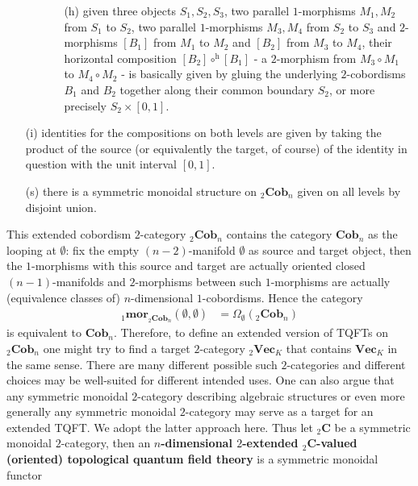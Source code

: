 \begin{enumerate}
\begin{enumerate}
\begin{enumerate}
\item[(h)]
given three objects $S_{1},S_{2},S_{3}$, two parallel $1$-morphisms $M_{1},M_{2}$ from $S_{1}$ to $S_{2}$, two parallel $1$-morphisms $M_{3},M_{4}$ from $S_{2}$ to $S_{3}$ and $2$-morphisms $[B_{1}]$ from $M_{1}$ to $M_{2}$ and $[B_{2}]$ from $M_{3}$ to $M_{4}$, their horizontal composition $[B_{2}] \circ^{\mathrm{h}} [B_{1}]$ - a $2$-morphism from $M_{3} \circ M_{1}$ to $M_{4} \circ M_{2}$ - is basically given by gluing the underlying $2$-cobordisms $B_{1}$ and $B_{2}$ together along their common boundary $S_{2}$, or more precisely $S_{2} \times [0,1]$.
\end{enumerate}
\end{enumerate}

\item[(i)]
identities for the compositions on both levels are given by taking the product of the source (or equivalently the target, of course) of the identity in question with the unit interval $[0,1]$.

\item[(s)]
there is a symmetric monoidal structure on ${_{2}}\mathbf{Cob}_{n}$ given on all levels by disjoint union.
\end{enumerate}
This extended cobordism $2$-category ${_{2}}\mathbf{Cob}_{n}$ contains the category $\mathbf{Cob}_{n}$ as the looping at $\emptyset$: fix the empty $(n-2)$-manifold $\emptyset$ as source and target object, then the $1$-morphisms with this source and target are actually oriented closed $(n-1)$-manifolds and $2$-morphisms between such $1$-morphisms are actually (equivalence classes of) $n$-dimensional $1$-cobordisms. Hence the category
\begin{align*}
  _{1}\mathbf{mor}_{{_{2}}\mathbf{Cob}_{n}}
  \left(
    \emptyset
    ,
    \emptyset
  \right)
  &=
  \Omega_{\emptyset}
  \left(
    {_{2}}\mathbf{Cob}_{n}
  \right)
\end{align*}
is equivalent to $\mathbf{Cob}_{n}$. Therefore, to define an extended version of TQFTs on ${_{2}}\mathbf{Cob}_{n}$ one might try to find a target $2$-category ${_{2}}\mathbf{Vec}_{K}$ that contains $\mathbf{Vec}_{K}$ in the same sense. There are many different possible such $2$-categories and different choices may be well-suited for different intended uses. One can also argue that any symmetric monoidal $2$-category describing algebraic structures or even more generally any symmetric monoidal $2$-category may serve as a target for an extended TQFT. We adopt the latter approach here. Thus let ${_{2}}\mathbf{C}$ be a symmetric monoidal $2$-category, then an \textbf{$n$-dimensional $2$-extended ${_{2}}\mathbf{C}$-valued (oriented) topological quantum field theory} is a symmetric monoidal functor
